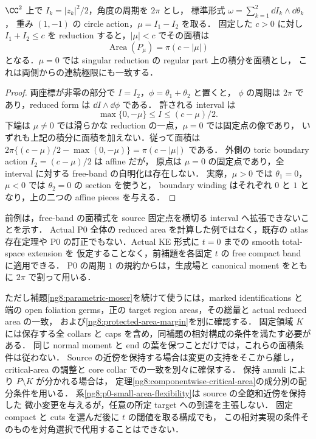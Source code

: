 \begin{example}
\label{ng8:source-dh-wall}
$\CC^2$ 上で $I_k=|z_k|^2/2$，角度の周期を $2\pi$ とし，
標準形式 $\omega=\sum_{k=1}^2\dd I_k\wedge\dd\theta_k$，
重み $(1,-1)$ の circle action，$\mu=I_1-I_2$ を取る．
固定した $c>0$ に対し $I_1+I_2\le c$ を reduction すると，$|\mu|<c$ でその面積は
\begin{equation}\label{ng8:eq:source-reduced-area}
 \operatorname{Area}(P_\mu)=\pi(c-|\mu|)
\end{equation}
となる．$\mu=0$ では singular reduction の regular part 上の積分を面積とし，
これは両側からの連続極限にも一致する．
\end{example}
\begin{proof}
両座標が非零の部分で $I=I_2$，$\phi=\theta_1+\theta_2$ と置くと，
$\phi$ の周期は $2\pi$ であり，reduced form は $\dd I\wedge\dd\phi$ である．
許される interval は
\[
 \max\{0,-\mu\}\le I\le(c-\mu)/2.
\]
下端は $\mu\ne0$ では滑らかな reduction の一点，$\mu=0$ では固定点の像であり，
いずれも上記の積分に面積を加えない．従って面積は
$2\pi\{(c-\mu)/2-\max(0,-\mu)\}=\pi(c-|\mu|)$ である．
外側の toric boundary action $I_2=(c-\mu)/2$ は affine だが，
原点は $\mu=0$ の固定点であり，全 interval に対する free-band の自明化は存在しない．
実際，$\mu>0$ では $\theta_1=0$，$\mu<0$ では $\theta_2=0$ の section を使うと，
boundary winding はそれぞれ $0$ と $1$ となり，上の二つの affine pieces を与える．
\end{proof}

\begin{remark}
\label{ng8:fixed-fiber-area-scope}
前例は，free-band の面積式を source 固定点を横切る interval へ拡張できないことを示す．
Actual P0 全体の reduced area を計算した例ではなく，既存の atlas 存在定理や
P0 の訂正でもない．Actual KE 形式に $t=0$ までの smooth total-space extension を
仮定することなく，前補題を各固定 $t$ の free compact band に適用できる．
P0 の周期 $1$ の規約からは，生成場と canonical moment をともに $2\pi$ で割って用いる．

ただし補題\ref{ng8:parametric-moser}を続けて使うには，marked identifications と
端の open foliation germs，正の target region areas，その総量と actual reduced area の一致，
および\eqref{ng8:protected-area-margin}を別に確認する．
固定領域 $K$ には保存する全 collars と caps を含め，同補題の相対構成の条件を満たす必要がある．
同じ normal moment と end の葉を保つことだけでは，これらの面積条件は従わない．
Source の近傍を保持する場合は変更の支持をそこから離し，
critical-area の調整と core collar での一致を別々に確保する．
保持 annuli により $P\setminus K$ が分かれる場合は，
定理\ref{ng8:componentwise-critical-area}の成分別の配分条件を用いる．
系\ref{ng8:p0-small-area-flexibility}は source の全飽和近傍を保持した
微小変更を与えるが，任意の所定 target への到達を主張しない．
固定 compact と cuts を選んだ後に $t$ の閾値を取る構成でも，
この相対実現の条件そのものを対角選択で代用することはできない．
\end{remark}

